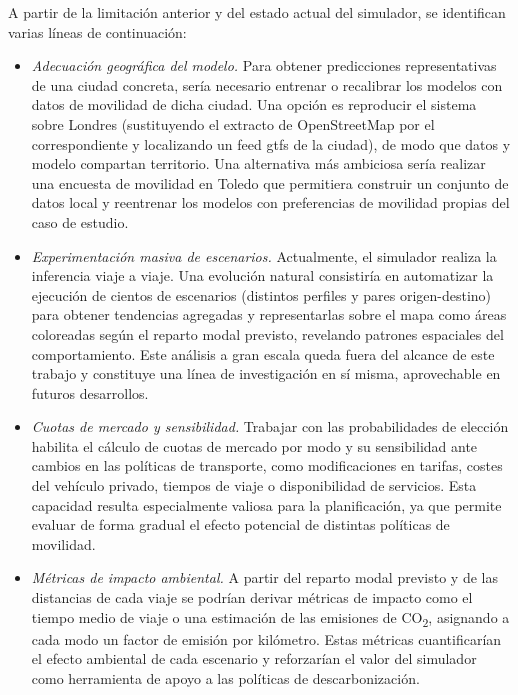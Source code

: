 A partir de la limitación anterior y del estado actual del simulador, se identifican varias líneas de continuación:

\begin{itemize}
  \item \textit{Adecuación geográfica del modelo.} Para obtener predicciones representativas de una ciudad concreta, sería necesario entrenar o recalibrar los modelos con datos de movilidad de dicha ciudad. Una opción es reproducir el sistema sobre Londres (sustituyendo el extracto de OpenStreetMap por el correspondiente y localizando un feed \gls{gtfs} de la ciudad), de modo que datos y modelo compartan territorio. Una alternativa más ambiciosa sería realizar una encuesta de movilidad en Toledo que permitiera construir un conjunto de datos local y reentrenar los modelos con preferencias de movilidad propias del caso de estudio.
  \newpage
  
  \item \textit{Experimentación masiva de escenarios.} Actualmente, el simulador realiza la inferencia viaje a viaje. Una evolución natural consistiría en automatizar la ejecución de cientos de escenarios (distintos perfiles y pares origen-destino) para obtener tendencias agregadas y representarlas sobre el mapa como áreas coloreadas según el reparto modal previsto, revelando patrones espaciales del comportamiento. Este análisis a gran escala queda fuera del alcance de este trabajo y constituye una línea de investigación en sí misma, aprovechable en futuros desarrollos.\newline
  
  \item \textit{Cuotas de mercado y sensibilidad.} Trabajar con las probabilidades de elección habilita el cálculo de cuotas de mercado por modo y su sensibilidad ante cambios en las políticas de transporte, como modificaciones en tarifas, costes del vehículo privado, tiempos de viaje o disponibilidad de servicios. Esta capacidad resulta especialmente valiosa para la planificación, ya que permite evaluar de forma gradual el efecto potencial de distintas políticas de movilidad.\newline
  
  \item \textit{Métricas de impacto ambiental.} A partir del reparto modal previsto y de las distancias de cada viaje se podrían derivar métricas de impacto como el tiempo medio de viaje o una estimación de las emisiones de CO\textsubscript{2}, asignando a cada modo un factor de emisión por kilómetro. Estas métricas cuantificarían el efecto ambiental de cada escenario y reforzarían el valor del simulador como herramienta de apoyo a las políticas de descarbonización.\newline
  

\end{itemize}
